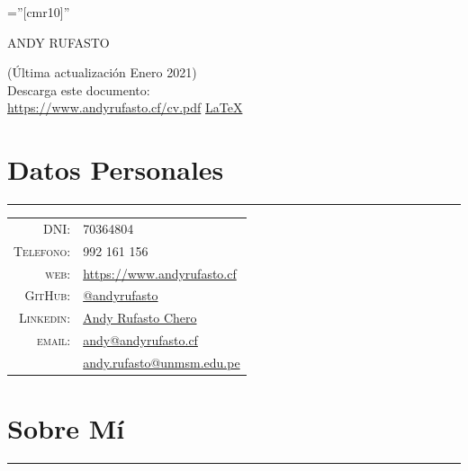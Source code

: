 \documentclass[a4paper,10pt]{article}
\begin{document}
\pagestyle{empty} %

\font\fb=''[cmr10]'' %

\par{\centering
		{\Huge ANDY RUFASTO\\ \bigskip\par} }


\hfill\begin{minipage}{0.5\linewidth}
	(Última actualización Enero 2021)\\ 
	Descarga este documento:\\
 	\href{https://www.andyrufasto.cf/cv.pdf}{https://www.andyrufasto.cf/cv.pdf}
	\href{https://www.github.com/andyrufasto.cf/cv}{\LaTeX}
\end{minipage}

\section{Datos Personales}
	\hrule
	\begin{tabular}{rl}
    \textsc{DNI:}       & 70364804\\
    \textsc{Telefono:}  & 992 161 156\\
    \textsc{web:}       & \href{https://www.andyrufasto.cf}{https://www.andyrufasto.cf}\\
    \textsc{GitHub:}    & \href{https://www.github.com/andyrufasto}{@andyrufasto}\\
    \textsc{Linkedin:}  & \href{https://www.linkedin.com/in/andyrufasto/}{Andy Rufasto Chero}\\
    \textsc{email:}     & \href{mailto:andy@andyrufasto.cf}{andy@andyrufasto.cf}\\
				                & \href{mailto:andy.rufasto@unmsm.edu.pe}{andy.rufasto@unmsm.edu.pe}\\
	\end{tabular}

\section{Sobre Mí}
	\hrule
\end{document}
